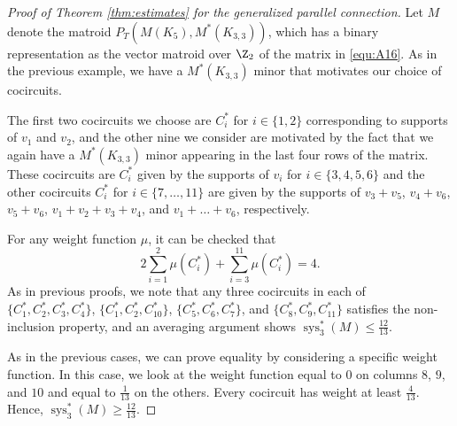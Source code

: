 \documentclass[reqno,12pt]{amsart}
\numberwithin{theorem}{section}
\theoremstyle{plain}
\theoremstyle{definition}
\theoremstyle{remark}
\numberwithin{equation}{section}
\numberwithin{table}{section}
\DeclareMathOperator{\sys}{sys}
\begin{document}
\begin{proof}[Proof of Theorem \ref{thm:estimates} for the generalized parallel connection] 
Let $M$ denote the matroid $P_T(M(K_5), M^*(K_{3,3}))$, which has a binary representation as the vector matroid over $\Z_2$ of the matrix in \eqref{equ:A16}. As in the previous example, we have a $M^*(K_{3,3})$ minor that motivates our choice of cocircuits. 

The first two cocircuits we choose are $C_i^*$ for $i \in \{1,2\}$ corresponding to supports of $v_1$ and $v_2$, and the other nine we consider are motivated by the fact that we again have a $M^*(K_{3,3})$ minor appearing in the last four rows of the matrix. These cocircuits are $C_i^*$ given by the supports of $v_i$ for $i \in \{3,4,5,6\}$ and the other cocircuits $C_i^*$ for $i \in \{7,\ldots,11\}$ are given by the supports of $v_3+v_5$, $v_4+v_6$, $v_5+v_6$, $v_1+v_2+v_3+v_4$, and $v_1+\ldots+v_6$, respectively. 

For any weight function $\mu$, it can be checked that
    \[2\sum_{i=1}^2 \mu(C_i^*) + \sum_{i=3}^{11} \mu(C_i^*) = 4.\]
As in previous proofs, we note that any three cocircuits in each of $\{C_1^*, C_2^*, C_3^*, C_4^*\}$, $\{C_1^*, C_2^*, C_{10}^*\}$, $\{C_5^*, C_6^*, C_7^*\}$, and $\{C_8^*, C_9^*, C_{11}^*\}$ satisfies the non-inclusion property, and an averaging argument shows $\sys_3^*(M) \leq \tfrac{12}{13}$.

As in the previous cases, we can prove equality by considering a specific weight function. In this case, we look at the weight function equal to $0$ on columns $8$, $9$, and $10$ and equal to $\tfrac 1 {13}$ on the others. Every cocircuit has weight at least $\tfrac{4}{13}$. Hence, $\sys^*_3(M)\geq \frac{12}{13}$.
\end{proof}



\end{document}

